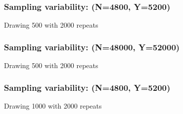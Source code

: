 \documentclass[handout]{beamer}
\begin{document}


   \begin{frame}
   \frametitle{Sampling variability: (N=4800, Y=5200)}
   \begin{center}
   \end{center}
   Drawing 500 with 2000 repeats
   \end{frame}



   \begin{frame}
   \frametitle{Sampling variability: (N=48000, Y=52000)}
   \begin{center}
   \end{center}
   Drawing 500 with 2000 repeats
   \end{frame}



   \begin{frame}
   \frametitle{Sampling variability: (N=4800, Y=5200)}
   \begin{center}
   \end{center}
   Drawing 1000 with 2000 repeats
   \end{frame}
\end{document}
